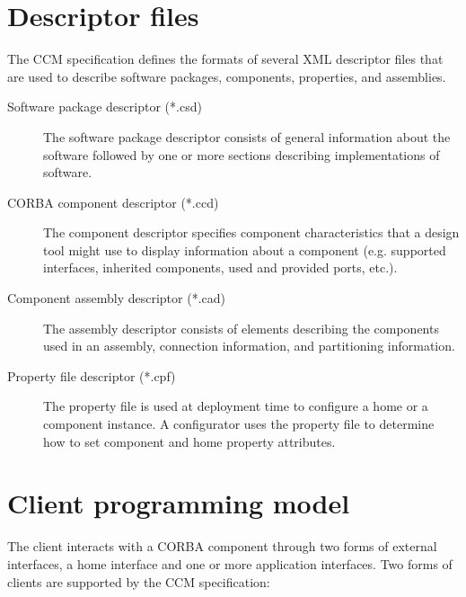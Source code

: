 \section{Descriptor files}

The CCM specification defines the formats of several XML descriptor files that
are used to describe software packages, components, properties, and assemblies.

\begin{description}
\item [Software package descriptor (*.csd)]
The software package descriptor consists of general information about the
software followed by one or more sections describing implementations of
software.

\item [CORBA component descriptor (*.ccd)]
The component descriptor specifies component characteristics that a design tool
might use to display information about a component (e.g. supported interfaces,
inherited components, used and provided ports, etc.).

\item [Component assembly descriptor (*.cad)]
The assembly descriptor consists of elements describing the components used in
an assembly, connection information, and partitioning information.

\item [Property file descriptor (*.cpf)]
The property file is used at deployment time to configure a home or a component
instance. A configurator uses the property file to determine how to set
component and home property attributes.
\end{description}

\section{Client programming model}

The client interacts with a CORBA component through two forms of external
interfaces, a home interface and one or more application interfaces. Two forms
of clients are supported by the CCM specification:

